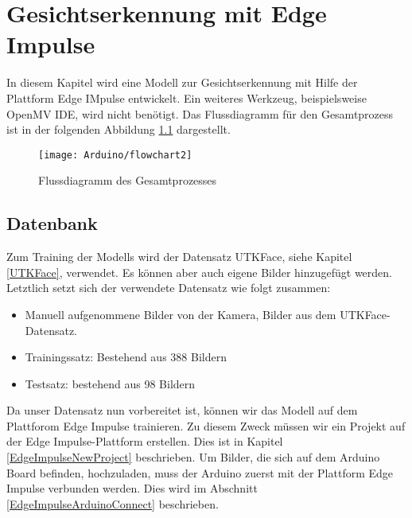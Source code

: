 %
%


\chapter{Gesichtserkennung mit Edge Impulse}

In diesem Kapitel wird eine Modell zur Gesichtserkennung mit Hilfe der Plattform Edge IMpulse entwickelt. Ein weiteres Werkzeug, beispielsweise OpenMV IDE, wird nicht benötigt. Das Flussdiagramm für den Gesamtprozess ist in der folgenden Abbildung \ref{FaceFlowChart} dargestellt. 

\begin{figure}[H]
	\centering
	\texttt{[image: Arduino/flowchart2]}
	\caption{Flussdiagramm des Gesamtprozesses}
	\label{FaceFlowChart}
\end{figure}


\section{Datenbank}  

Zum Training der Modells wird der Datensatz UTKFace, siehe Kapitel \ref{UTKFace}, verwendet. Es können aber auch eigene Bilder hinzugefügt werden. Letztlich setzt sich der verwendete Datensatz wie folgt zusammen:

\begin{itemize}
	\item Manuell aufgenommene Bilder von der Kamera, Bilder aus dem UTKFace-Datensatz.
	\item Trainingssatz: Bestehend aus 388 Bildern
	\item Testsatz: bestehend aus 98 Bildern
\end{itemize}

\bigskip



Da unser Datensatz nun vorbereitet ist, können wir das Modell auf dem Plattforom Edge Impulse trainieren. Zu diesem Zweck müssen wir ein Projekt auf der Edge Impulse-Plattform erstellen. Dies ist in Kapitel \ref{EdgeImpulseNewProject} beschrieben. Um Bilder, die sich auf dem Arduino Board befinden, hochzuladen, muss der Arduino zuerst mit der Plattform Edge Impulse verbunden werden. Dies wird im Abschnitt \ref{EdgeImpulseArduinoConnect} beschrieben.






